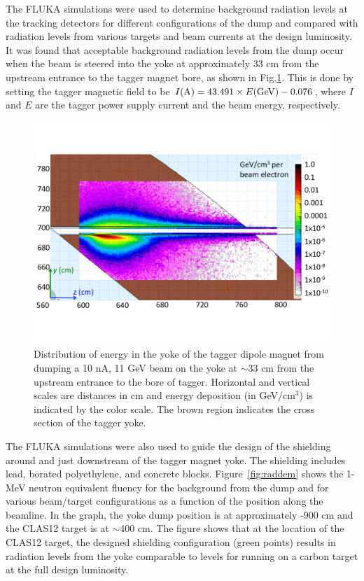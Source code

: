 The FLUKA simulations were used to determine background radiation levels at the tracking detectors for different configurations of the 
dump and compared with radiation levels from various targets and beam currents at the design luminosity.  It was found that acceptable 
background radiation levels from the dump occur when the beam is steered into the yoke at approximately 33 cm from the upstream 
entrance to the tagger magnet bore, as shown in Fig.\ref{fig:yokedump}. This is done by setting the tagger magnetic field to be 
$I({\rm A}) = 43.491\times E({\rm GeV}) - 0.076$, where $I$ and $E$ are 
the tagger power supply current and the beam energy, respectively.   
%
\begin{figure}[hbt]
\begin{center}
\includegraphics[width=.45\textwidth]{YokeDump.pdf}
	\caption{Distribution of energy in the yoke of the tagger dipole magnet from dumping a 10 nA, 11 GeV beam on the yoke at 
	$\sim33$ cm from the upstream entrance to the bore of tagger. Horizontal and vertical scales are distances in cm and energy 
	deposition (in GeV/cm$^3$) is indicated by the color scale. The brown region indicates the cross section of the tagger yoke.}
\label{fig:yokedump}
\end{center}
\end{figure}

The FLUKA simulations were also used to guide the design of the shielding around and just downstream of the tagger magnet yoke. 
The shielding includes lead, borated polyethylene, and concrete blocks. Figure~\ref{fig:raddem} shows the 1-MeV neutron equivalent 
fluency for the background from the dump and for various beam/target configurations as a function of the position along the beamline. 
In the graph, the yoke dump position is at approximately -900 cm and the CLAS12 target is at $\sim400$ cm. The figure shows that at 
the location of the CLAS12 target, the designed shielding configuration (green points) results in radiation levels from the yoke 
comparable to levels for running on a carbon target at the full design luminosity.   

